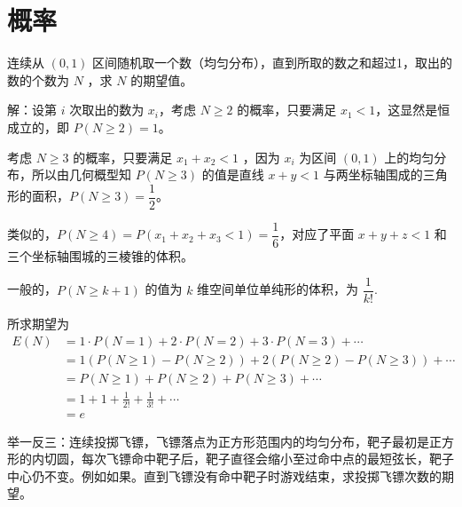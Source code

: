 \chapter{概率}

连续从 $ (0,1) $ 区间随机取一个数（均匀分布），直到所取的数之和超过1，取出的数的个数为 $ N $ ，求 $ N $ 的期望值。

解：设第 $ i $ 次取出的数为 $ x_i $，考虑 $ N\ge 2 $ 的概率，只要满足 $ x_1<1 $，这显然是恒成立的，即 $ P(N\ge 2)=1 $。

考虑 $ N\ge 3 $ 的概率，只要满足 $ x_1+x_2<1 $ ，因为 $ x_i $ 为区间 $ (0,1) $ 上的均匀分布，所以由几何概型知 $ P(N\ge 3) $ 的值是直线 $ x+y<1 $ 与两坐标轴围成的三角形的面积，$ P(N\ge 3)=\dfrac{1}{2} $。

类似的，$ P(N\ge 4)=P(x_1+x_2+x_3<1)=\dfrac{1}{6} $，对应了平面 $ x+y+z<1 $ 和三个坐标轴围城的三棱锥的体积。

一般的，$ P(N\ge k+1) $ 的值为 $ k $ 维空间单位单纯形的体积，为 $ \dfrac{1}{k!} $.

所求期望为
\begin{align*}
E(N) &= 1\cdot P(N=1) + 2\cdot P(N=2) + 3\cdot P(N=3) + \cdots \\
	&= 1(P(N\ge 1) - P(N\ge 2)) + 2(P(N\ge 2) - P(N\ge 3)) + \cdots \\
	&= P(N\ge 1) + P(N\ge 2) + P(N\ge 3) + \cdots \\
	&= 1 + 1 + \frac{1}{2!} + \frac{1}{3!} + \cdots \\
	&= e
\end{align*}


举一反三：连续投掷飞镖，飞镖落点为正方形范围内的均匀分布，靶子最初是正方形的内切圆，每次飞镖命中靶子后，靶子直径会缩小至过命中点的最短弦长，靶子中心仍不变。例如如果。直到飞镖没有命中靶子时游戏结束，求投掷飞镖次数的期望。

